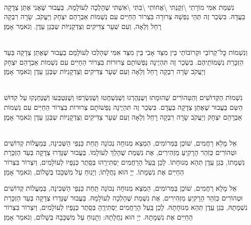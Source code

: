 \\
נִשְׁמַת אִמִּי מוֹרָתִי \textbackslash זְקֶנְתּי \textbackslash אֲחוׂתִי \textbackslash בִּתִּי \textbackslash אִשְׁתּי
שֶׁהָלְכָה לְעוֹלָמָהּ, בַּעֲבוּר שֶׁאֲנִי אֶתֵּן צְדָקָה בַּעֲדָהּ. בִּשְׂכַר זֶה תְּהֵי נַפְשָׁהּ צְרוּרָה בִּצְרוֹר הַחַיִּים עִם נִשְׁמוֹת אַבְרָהַם יִצְחָק וְיַעֲקֹב, שָׂרָה רִבְקָה רָחֵל וְלֵאָה, וְעִם שְׁעָר צַדִּיקִים וְצַדְקָנִיּוֹת שְבְּגַן עֵדֶן. וְנֹאמַר אָמֶן׃

 \\
וְנִשְׁמוֹת כׇּל־קְרוֹבַי וּקְרוֹבוֹתַי בֵּין מִצַּד אָבִי בֵּין מִצַּד אִמִּי
שְׁהָלְכוּ לְעוׂלָמָם
בַעֲבוּר שֶׁאֶתֵּן צְדָקָה בְּעַד הַזְכָּרַת נִשְׁמוֹתֵיהֶם. בִּשְׂכַר זֶה תִּהְיֶינָה נַפְשׁוֹתָם צְרוּרוֹת בִּצְרוֹר הַחַיִּים עִם נִשְׁמוֹת אַבְרָהַם יִצְחָק וְיַעֲקֹב שָׂרָה רִבְקָה רָחֵל וְלֵאָה וְעִם שְׁעָר צַדִּיקִים וְצַדְקָנִיּוֹת שְבְּגַן עֵדֶן וְנֹאמַר אָמֶן׃



\\
נִשְׁמוׂת הַקְּדוׂשִׁים וְהַטְּהוׂרִים
שֶׁהוּמָתוּ וְשֶנֶּהֶרְגוּ וְשֶׁנִּשְׁחֲטוּ וְשֶׁנִּשְׂרְפוּ וְשֶׁנִּטְבְּעוּ וְשֶׁנֶּחְנְקוּ עַל קִדּוּשׁ הַשֵּם בַעֲבוּר שֶׁאֶתֵּן צְדָקָה בְּעֲדָם. בִּשְׂכַר זֶה תִּהְיֶינָה נַפְשׁוֹתָם צְרוּרוֹת בִּצְרוֹר הַחַיִּים עִם נִשְׁמוֹת אַבְרָהַם יִצְחָק וְיַעֲקֹב שָׂרָה רִבְקָה רָחֵל וְלֵאָה וְעִם שְׁעָר צַדִּיקִים וְצַדְקָנִיּוֹת שְבְּגַן עֵדֶן וְנֹאמַר אָמֶן׃

\\
אֵל מָלֵא רַחֲמִים, שׁוֹכֵן בַּמְּרוֹמִים, הַמְצֵא מְנוּחָה נְכוֹנָה תַּֽחַת כַּנְפֵי הַשְּׁכִינָה, בְּמַעֲלוֹת קְדוֹשִׁים וּטְהוֹרִים כְּזֹֽהַר הָרָקִֽיעַ מַזְהִירִים, אֶת נִשְׁמַת  שֶׁהָלַךְ לְעוֹלָמוֹ. בַּעֲבוּר שֶׁנָּדְרוּ צְדָקָה בְּעַד הַזְכָּרַת נִשְׁמָתוֹ, בְּגַן עֵֽדֶן תְּהֵא מְנוּחָתוֹ. לָכֵן בַּֽעַל הָרַחֲמִים יַסְתִּירֵֽהוּ בְּסֵֽתֶר כְּנָפָיו לְעוֹלָמִים, וְיִצְרוֹר בִּצְרוֹר הַחַיִּים אֶת נִשְׁמָתוֹ. יְיָ הוּא נַחֲלָתוֹ; וְיָנֽוּחַ עַל מִשְׁכָּבוֹ בְּשָׁלוֹם, וְנֹאמַר אָמֵן׃

אֵל מָלֵא רַחֲמִים, שׁוֹכֵן בַּמְּרוֹמִים, הַמְצֵא מְנוּחָה נְכוֹנָה תַּֽחַת כַּנְפֵי הַשְּׁכִינָה, בְּמַעֲלוֹת קְדוֹשִׁים וּטְהוֹרִים כְּזֹֽהַר הָרָקִֽיעַ מַזְהִירִים, אֶת נִשְׁמַת  שֶׁהָלְכָה לְעוֹלָמָהּ. בַּעֲבוּר שֶׁנָּדְרוּ צְדָקָה בְּעַד הַזְכָּרַת נִשְׁמָתָהּ, בְּגַן עֵֽדֶן תְּהֵא מְנוּחָתָהּ. לָכֵן בַּֽעַל הָרַחֲמִים יַסְתִּירֶֽהָ בְּסֵֽתֶר כְּנָפָיו לְעוֹלָמִים, וְיִצְרוֹר בִּצְרוֹר הַחַיִּים אֶת נִשְׁמָתָהּ. יְיָ הוּא נַחֲלָתָהּ; וְתָנֽוּחַ עַל מִשְׁכָּבָהּ בְּשָׁלוֹם, וְנֹאמַר אָמֵן׃

